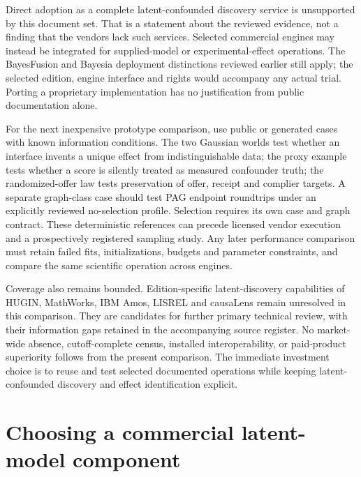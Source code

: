 Direct adoption as a complete latent-confounded discovery service is
unsupported by this document set. That is a statement about the reviewed
evidence, not a finding that the vendors lack such services. Selected
commercial engines may instead be integrated for supplied-model or
experimental-effect operations. The BayesFusion and Bayesia deployment
distinctions reviewed earlier still apply; the selected edition, engine
interface and rights would accompany any actual trial. Porting a
proprietary implementation has no justification from public
documentation alone. \citep{exec13_smile_license,exec13_bayesia_api}

For the next inexpensive prototype comparison, use public or generated
cases with known information conditions. The two Gaussian worlds test
whether an interface invents a unique effect from indistinguishable
data; the proxy example tests whether a score is silently treated as
measured confounder truth; the randomized-offer law tests preservation
of offer, receipt and complier targets. A separate graph-class case
should test PAG endpoint roundtrips under an explicitly reviewed
no-selection profile. Selection requires its own case and graph
contract. These deterministic references can precede licensed vendor
execution and a prospectively registered sampling study. Any later
performance comparison must retain failed fits, initializations, budgets
and parameter constraints, and compare the same scientific operation
across engines.

Coverage also remains bounded. Edition-specific latent-discovery
capabilities of HUGIN, MathWorks, IBM Amos, LISREL and causaLens remain
unresolved in this comparison. They are candidates for further primary
technical review, with their information gaps retained in the
accompanying source register. No market-wide absence, cutoff-complete
census, installed interoperability, or paid-product superiority follows
from the present comparison. The immediate investment choice is to reuse
and test selected documented operations while keeping latent-confounded
discovery and effect identification explicit.
\label{exec13:latent-commercial-end}


\hypertarget{choosing-a-commercial-latent-model-component}{%
\section{Choosing a commercial latent-model
component}\label{choosing-a-commercial-latent-model-component}}

